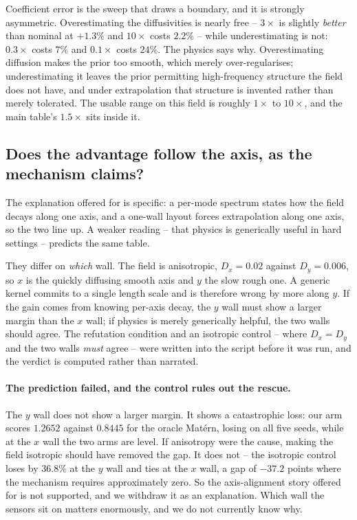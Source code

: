 Coefficient error is the sweep that draws a boundary, and it is strongly
asymmetric.  Overestimating the diffusivities is nearly free -- $3\times$ is
slightly \emph{better} than nominal at $+1.3\%$ and $10\times$ costs $2.2\%$ --
while underestimating is not: $0.3\times$ costs $7\%$ and $0.1\times$ costs
$24\%$.  The physics says why.  Overestimating diffusion makes the prior too
smooth, which merely over-regularises; underestimating it leaves the prior
permitting high-frequency structure the field does not have, and under
extrapolation that structure is invented rather than merely tolerated.  The
usable range on this field is roughly $1\times$ to $10\times$, and the main
table's $1.5\times$ sits inside it.

\subsection{Does the advantage follow the axis, as the mechanism claims?}
The explanation offered for  is specific: a per-mode spectrum
states how the field decays along one axis, and a one-wall layout forces
extrapolation along one axis, so the two line up.  A weaker reading -- that
physics is generically useful in hard settings -- predicts the same table.

They differ on \emph{which} wall.  The field is anisotropic, $D_x = 0.02$ against
$D_y = 0.006$, so $x$ is the quickly diffusing smooth axis and $y$ the slow rough
one.  A generic kernel commits to a single length scale and is therefore wrong by
more along $y$.  If the gain comes from knowing per-axis decay, the $y$ wall must
show a larger margin than the $x$ wall; if physics is merely generically helpful,
the two walls should agree.  The refutation condition and an isotropic control --
where $D_x = D_y$ and the two walls \emph{must} agree -- were written into the
script before it was run, and the verdict is computed rather than narrated.



\paragraph{The prediction failed, and the control rules out the rescue.}
The $y$ wall does not show a larger margin.  It shows a catastrophic loss: our
arm scores $1.2652$ against $0.8445$ for the oracle Mat\'ern, losing on all five
seeds, while at the $x$ wall the two arms are level.  If anisotropy were the
cause, making the field isotropic should have removed the gap.  It does not --
the isotropic control loses by $36.8\%$ at the $y$ wall and ties at the $x$ wall,
a gap of $-37.2$ points where the mechanism requires approximately zero.  So the
axis-alignment story offered for  is not supported, and we
withdraw it as an explanation.  Which wall the sensors sit on matters enormously,
and we do not currently know why.


